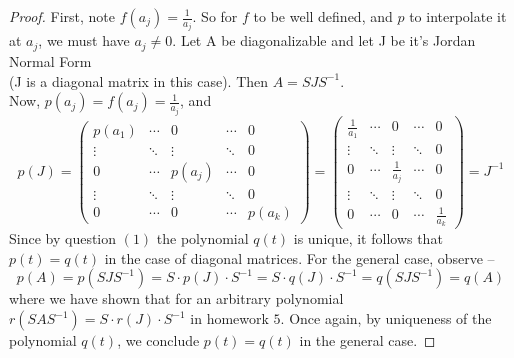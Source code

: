\documentclass[11pt]{article}
\theoremstyle{quest}
\begin{document}
\begin{proof}
First, note $f(a_j) = \frac{1}{a_j}$. So for $f$ to be well defined, and $p$ to interpolate it at $a_j$, we must have $a_j \ne 0$. Let A be diagonalizable and let J be it's Jordan Normal Form \\(J is a diagonal matrix in this case). Then $A = SJS^{-1}$. \\Now, $p(a_j) = f(a_j) = \frac{1}{a_j}$, and
$$p(J) = \begin{pmatrix}
p(a_1) & \cdots & 0 & \cdots & 0 \\
\vdots & \ddots & \vdots & \ddots  & 0 \\
0 & \cdots & p(a_j) & \cdots & 0 \\
\vdots & \ddots & \vdots & \ddots & 0 \\
0 & \cdots & 0 & \cdots & p(a_k)
\end{pmatrix} = \begin{pmatrix}
\frac{1}{a_1} & \cdots & 0 & \cdots & 0 \\
\vdots & \ddots & \vdots & \ddots  & 0 \\
0 & \cdots & \frac{1}{a_j} & \cdots & 0 \\
\vdots & \ddots & \vdots & \ddots & 0 \\
0 & \cdots & 0 & \cdots & \frac{1}{a_k}
\end{pmatrix} = J^{-1}$$
Since by question $(1)$ the polynomial $q(t)$ is unique, it follows that $p(t) = q(t)$ in the case of diagonal matrices. For the general case, observe --
$$p(A) = p(SJS^{-1}) = S\cdot p(J)\cdot S^{-1} = S\cdot q(J)\cdot S^{-1} = q(SJS^{-1}) = q(A)$$
where we have shown that for an arbitrary polynomial $r(SAS^{-1}) = S\cdot r(J)\cdot S^{-1}$ in homework $5$. Once again, by uniqueness of the polynomial $q(t)$, we conclude $p(t) = q(t)$ in the general case.
\end{proof}
\end{document}

